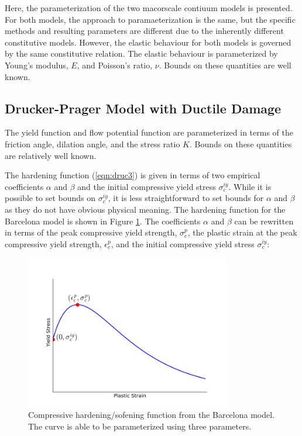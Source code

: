 Here, the parameterization of the two macorscale contiuum models is presented. For both models, the approach to paramaeterization is the same, but the specific methods and resulting parameters are different due to the inherently different constitutive models. However, the elastic behaviour for both models is governed by the same constitutive relation. The elastic behaviour is parameterized by Young's modulus, $E$, and Poisson's ratio, $\nu$. Bounds on these quantities are well known. 

\subsection{Drucker-Prager Model with Ductile Damage}
The yield function and flow potential function are parameterized in terms of the friction angle, dilation angle, and the stress ratio $K$. Bounds on these quantities are relatively well known.

The hardening function (\ref{eqn:druc3}) is given in terms of two empirical coefficients $\alpha$ and $\beta$ and the initial compressive yield stress $\sigma_c^{iy}$.  While it is possible to set bounds on $\sigma_c^{iy}$, it is less straightforward to set bounds for $\alpha$ and $\beta$ as they do not have obvious physical meaning. The hardening function for the Barcelona model is shown in Figure \ref{fig:barcelona}. The coefficients $\alpha$ and $\beta$ can be rewritten in terms of the peak compressive yield strength, $\sigma_{c}^{p}$, the plastic strain at the peak compressive yield strength, $\epsilon_c^{p}$, and the initial compressive yield stress $\sigma_c^{iy}$:

\begin{figure}[!htb]
\begin{center}
\includegraphics[width=0.8\textwidth]{figures/Chapter3/BarcelonaCurve}
\caption{{\label{fig:barcelona}Compressive hardening/sofening function from the Barcelona model. The curve is able to be parameterized using three parameters.%
}}
\end{center}
\end{figure}

